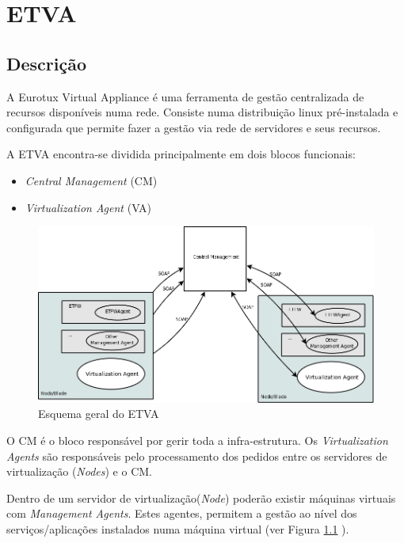 \chapter{\textsf{ETVA}}
\section{Descrição}
A Eurotux Virtual Appliance é uma ferramenta de gestão centralizada de recursos disponíveis numa rede. Consiste numa distribuição linux pré-instalada e configurada que permite fazer a gestão via rede de servidores e seus recursos.


A ETVA encontra-se dividida principalmente em dois blocos funcionais:

\begin{itemize}
	\item \emph{Central Management} (CM)
        \item \emph{Virtualization Agent} (VA)
\end{itemize}

\begin{figure}[H]
	\begin{center}
	\includegraphics[scale=0.35]{screenshots/etva_blocos.png}
	\caption{Esquema geral do ETVA}
	\label{fig:etva_blocos}
	\end{center}
\end{figure}

O \textsf{CM} é o bloco responsável por gerir toda a infra-estrutura.
Os \emph{Virtualization Agents} são responsáveis pelo processamento dos pedidos entre os servidores de virtualização (\emph{Nodes}) e o CM.

Dentro de um servidor de virtualização(\emph{Node}) poderão existir máquinas virtuais com \emph{Management Agents}. Estes agentes, permitem a gestão ao nível dos serviços/aplicações instalados numa máquina virtual (ver Figura \ref{fig:etva_blocos} ).

